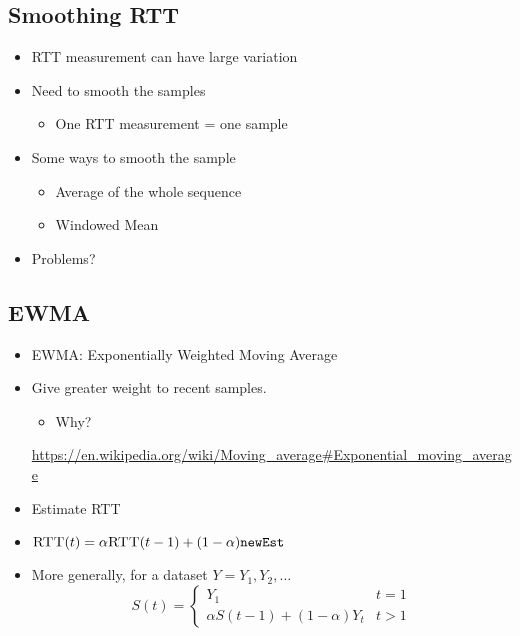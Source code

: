 \subsection{Smoothing RTT}
\begin{itemize}[nosep]
    \item RTT measurement can have large variation
    \item Need to smooth the samples
          \begin{itemize}[nosep]
              \item One RTT measurement = one sample
          \end{itemize}
    \item Some ways to smooth the sample
          \begin{itemize}[nosep]
              \item Average of the whole sequence
              \item Windowed Mean
          \end{itemize}
    \item Problems?
\end{itemize}

\subsection{EWMA}
\begin{itemize}[nosep]
    \item EWMA: Exponentially Weighted Moving Average
    \item Give greater weight to recent samples.
          \begin{itemize}[nosep]
              \item Why?
          \end{itemize}
          \url{https://en.wikipedia.org/wiki/Moving_average#Exponential_moving_average}
    \item Estimate RTT
    \item $\textproc{RTT}(t) = \alpha \textproc{RTT}(t - 1) + (1 - \alpha) \texttt{newEst}$
    \item More generally, for a dataset $Y = Y_1, Y_2, \dots$
          \[S(t) = \begin{cases}Y_1 & t = 1\\\alpha S(t - 1) + (1 - \alpha)Y_t & t > 1\end{cases}\]
\end{itemize}